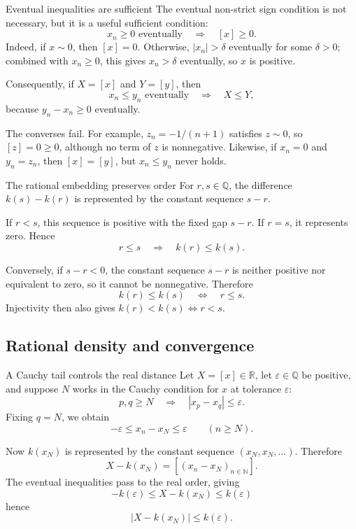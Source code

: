 \documentclass[aspectratio=169,11pt]{beamer}
\newcommand{\N}{\mathbb N}
\newcommand{\Q}{\mathbb Q}
\newcommand{\R}{\mathbb R}
\begin{document}
\begin{frame}{Eventual inequalities are sufficient}
  The eventual non-strict sign condition is not necessary, but it is a useful
  sufficient condition:
  \[
    \boxed{x_n\ge0\text{ eventually}\quad\Longrightarrow\quad [x]\ge0.}
  \]
  Indeed, if \(x\sim0\), then \([x]=0\).  Otherwise, \(|x_n|>\delta\)
  eventually for some \(\delta>0\); combined with \(x_n\ge0\), this gives
  \(x_n>\delta\) eventually, so \(x\) is positive.

  Consequently, if \(X=[x]\) and \(Y=[y]\), then
  \[
    \boxed{x_n\le y_n\text{ eventually}\quad\Longrightarrow\quad X\le Y,}
  \]
  because \(y_n-x_n\ge0\) eventually.

  The converses fail.  For example, \(z_n=-1/(n+1)\) satisfies \(z\sim0\),
  so \([z]=0\ge0\), although no term of \(z\) is nonnegative.  Likewise,
  if \(x_n=0\) and \(y_n=z_n\), then \([x]=[y]\), but \(x_n\le y_n\)
  never holds.
\end{frame}

\begin{frame}{The rational embedding preserves order}
  For \(r,s\in\Q\), the difference \(k(s)-k(r)\) is represented by the
  constant sequence \(s-r\).

  If \(r<s\), this sequence is positive with the fixed gap \(s-r\).  If
  \(r=s\), it represents zero.  Hence
  \[
    r\le s\quad\Longrightarrow\quad k(r)\le k(s).
  \]

  Conversely, if \(s-r<0\), the constant sequence \(s-r\) is neither
  positive nor equivalent to zero, so it cannot be nonnegative.  Therefore
  \[
    \boxed{k(r)\le k(s)\quad\Longleftrightarrow\quad r\le s.}
  \]
  Injectivity then also gives
  \(k(r)<k(s)\Longleftrightarrow r<s\).
\end{frame}

\subsection{Rational density and convergence}

\begin{frame}[label=cauchy-tail-distance]{A Cauchy tail controls the real distance}
  \small
  Let \(X=[x]\in\R\), let \(\varepsilon\in\Q\) be positive, and suppose \(N\)
  works in the Cauchy condition for \(x\) at tolerance \(\varepsilon\):
  \[
    p,q\ge N
    \quad\Longrightarrow\quad
    |x_p-x_q|\le\varepsilon.
  \]
  Fixing \(q=N\), we obtain
  \[
    -\varepsilon\le x_n-x_N\le\varepsilon
    \qquad(n\ge N).
  \]

  Now \(k(x_N)\) is represented by the constant sequence
  \((x_N,x_N,\ldots)\).  Therefore
  \[
    X-k(x_N)=[(x_n-x_N)_{n\in\N}].
  \]
  The eventual inequalities pass to the real order, giving
  \[
    -k(\varepsilon)\le X-k(x_N)\le k(\varepsilon)
  \]
  hence
  \[
\boxed{|X-k(x_N)|\le k(\varepsilon).}
  \]
\end{frame}
\end{document}
